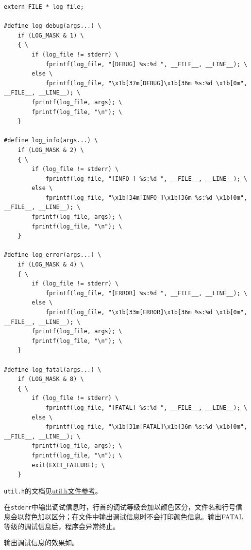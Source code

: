 \documentclass[lang=cn,11pt,a4paper,cite=authornum]{paper}
\begin{document}
\begin{code}
\begin{verbatim}
extern FILE * log_file;

#define log_debug(args...) \
    if (LOG_MASK & 1) \
    { \
        if (log_file != stderr) \
            fprintf(log_file, "[DEBUG] %s:%d ", __FILE__, __LINE__); \
        else \
            fprintf(log_file, "\x1b[37m[DEBUG]\x1b[36m %s:%d \x1b[0m", __FILE__, __LINE__); \
        fprintf(log_file, args); \
        fprintf(log_file, "\n"); \
    }
 
#define log_info(args...) \
    if (LOG_MASK & 2) \
    { \
        if (log_file != stderr) \
            fprintf(log_file, "[INFO ] %s:%d ", __FILE__, __LINE__); \
        else \
            fprintf(log_file, "\x1b[34m[INFO ]\x1b[36m %s:%d \x1b[0m", __FILE__, __LINE__); \
        fprintf(log_file, args); \
        fprintf(log_file, "\n"); \
    }
 
#define log_error(args...) \
    if (LOG_MASK & 4) \
    { \
        if (log_file != stderr) \
            fprintf(log_file, "[ERROR] %s:%d ", __FILE__, __LINE__); \
        else \
            fprintf(log_file, "\x1b[33m[ERROR]\x1b[36m %s:%d \x1b[0m", __FILE__, __LINE__); \
        fprintf(log_file, args); \
        fprintf(log_file, "\n"); \
    }
 
#define log_fatal(args...) \
    if (LOG_MASK & 8) \
    { \
        if (log_file != stderr) \
            fprintf(log_file, "[FATAL] %s:%d ", __FILE__, __LINE__); \
        else \
            fprintf(log_file, "\x1b[31m[FATAL]\x1b[36m %s:%d \x1b[0m", __FILE__, __LINE__); \
        fprintf(log_file, args); \
        fprintf(log_file, "\n"); \
        exit(EXIT_FAILURE); \
    }
\end{verbatim}
\end{code}

\texttt{util.h}的文档见\href{run:./APIdoc/util_8h.html}{util.h文件参考}。

在\texttt{stderr}中输出调试信息时，行首的调试等级会加以颜色区分，文件名和行号信息会以蓝色加以区分；在文件中输出调试信息时不会打印颜色信息。输出FATAL等级的调试信息后，程序会异常终止。

输出调试信息的效果如\figref{fig:log}。
\end{document}
